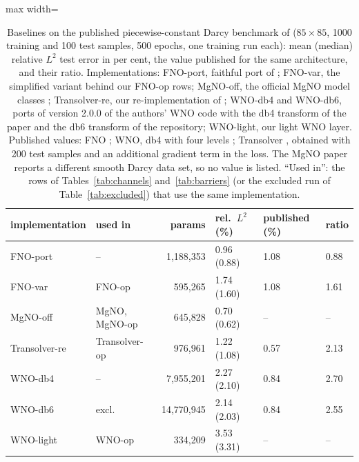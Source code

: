 \begin{table}[tbp]\centering\footnotesize\setlength{\tabcolsep}{4pt}
\caption{Baselines on the published piecewise-constant Darcy benchmark of \cite{li2021fno} ($85\times85$, 1000 training and 100 test samples, 500 epochs, one training run each): mean (median) relative $L^2$ test error in per cent, the value published for the same architecture, and their ratio. Implementations: FNO-port, faithful port of \cite{li2021fno}; FNO-var, the simplified variant behind our FNO-op rows; MgNO-off, the official MgNO model classes \cite{he2024mgno}; Transolver-re, our re-implementation of \cite{wu2024transolver}; WNO-db4 and WNO-db6, ports of version 2.0.0 of the authors' WNO code with the db4 transform of the paper and the db6 transform of the repository; WNO-light, our light WNO layer. Published values: FNO \cite{li2021fno}; WNO, db4 with four levels \cite{tripura2023wno}; Transolver \cite{wu2024transolver}, obtained with 200 test samples and an additional gradient term in the loss. The MgNO paper \cite{he2024mgno} reports a different smooth Darcy data set, so no value is listed. ``Used in'': the rows of Tables~\ref{tab:channels} and~\ref{tab:barriers} (or the excluded run of Table~\ref{tab:excluded}) that use the same implementation.}\label{tab:published}
\begin{adjustbox}{max width=\linewidth}
\begin{tabular}{llrlll}\toprule
implementation & used in & params & rel.\ $L^2$ (\%) & published (\%) & ratio \\\midrule
FNO-port & -- & 1{,}188{,}353 & 0.96 (0.88) & 1.08 & 0.88 \\
FNO-var & FNO-op & 595{,}265 & 1.74 (1.60) & 1.08 & 1.61 \\
MgNO-off & MgNO, MgNO-op & 645{,}828 & 0.70 (0.62) & -- & -- \\
Transolver-re & Transolver-op & 976{,}961 & 1.22 (1.08) & 0.57 & 2.13 \\
WNO-db4 & -- & 7{,}955{,}201 & 2.27 (2.10) & 0.84 & 2.70 \\
WNO-db6 & excl. & 14{,}770{,}945 & 2.14 (2.03) & 0.84 & 2.55 \\
WNO-light & WNO-op & 334{,}209 & 3.53 (3.31) & -- & -- \\
\bottomrule\end{tabular}
\end{adjustbox}
\end{table}
